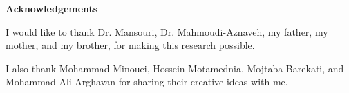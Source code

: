 \cleardoublepage


\begin{center}\textbf{Acknowledgements}\end{center}

I would like to thank Dr. Mansouri, Dr. Mahmoudi-Aznaveh, my father, my mother, and my brother, for making this research possible.

I also thank Mohammad Minouei, Hossein Motamednia, Mojtaba Barekati, and Mohammad Ali Arghavan for sharing their creative ideas with me.
\cleardoublepage




\renewcommand\contentsname{Table of Contents}
\tableofcontents
\cleardoublepage
{}    %

\listoftables
\cleardoublepage
{}		%

\listoffigures
\cleardoublepage
{}		%



